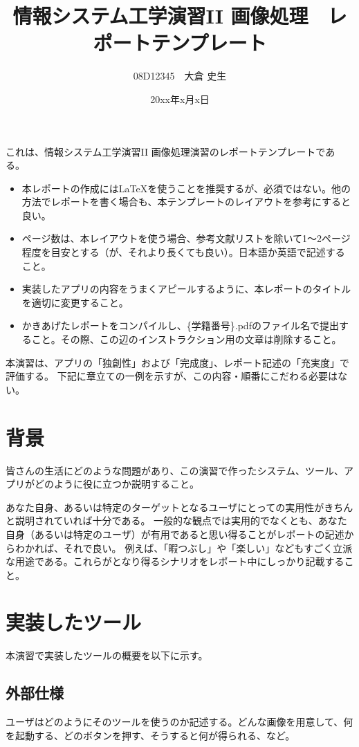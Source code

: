 \documentclass[twocolumn, a4paper]{jsarticle}
\begin{document}
\title{情報システム工学演習II 画像処理　レポートテンプレート}
\author{08D12345　大倉 史生}
\date{20xx年x月x日} 
\twocolumn[
\maketitle
]

これは、情報システム工学演習II 画像処理演習のレポートテンプレートである。
\begin{itemize}
\item 本レポートの作成には\LaTeX を使うことを推奨するが、必須ではない。他の方法でレポートを書く場合も、本テンプレートのレイアウトを参考にすると良い。
\item ページ数は、本レイアウトを使う場合、参考文献リストを除いて1～2ページ程度を目安とする（が、それより長くても良い）。日本語か英語で記述すること。
\item 実装したアプリの内容をうまくアピールするように、本レポートのタイトルを適切に変更すること。
\item かきあげたレポートをコンパイルし、\{学籍番号\}.pdfのファイル名で提出すること。その際、この辺のインストラクション用の文章は削除すること。
\end{itemize}
本演習は、アプリの「独創性」および「完成度」、レポート記述の「充実度」で評価する。
下記に章立ての一例を示すが、この内容・順番にこだわる必要はない。

\section{背景}
皆さんの生活にどのような問題があり、この演習で作ったシステム、ツール、アプリがどのように役に立つか説明すること。

あなた自身、あるいは特定のターゲットとなるユーザにとっての実用性がきちんと説明されていれば十分である。
一般的な観点では実用的でなくとも、あなた自身（あるいは特定のユーザ）が有用であると思い得ることがレポートの記述からわかれば、それで良い。
例えば、「暇つぶし」や「楽しい」などもすごく立派な用途である。これらがとなり得るシナリオをレポート中にしっかり記載すること。

\section{実装したツール}
本演習で実装したツールの概要を以下に示す。

\subsection{外部仕様}
ユーザはどのようにそのツールを使うのか記述する。どんな画像を用意して、何を起動する、どのボタンを押す、そうすると何が得られる、など。
\end{document}
